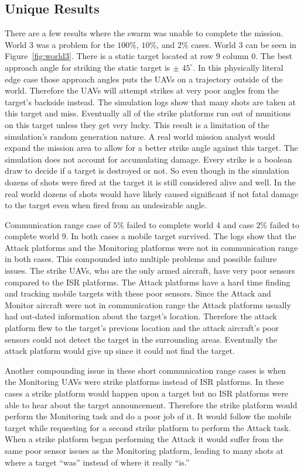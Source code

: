 \begin{multicols*}{2}
\section{Unique Results}
There are a few results where the swarm was unable to complete the mission.  World 3 was a problem for the $100\%$, $10\%$, and $2\%$ cases.  World 3 can be seen in Figure~\ref{fig:world3}.  There is a static target located at row 9 column 0.  The best approach angle for striking the static target is $\pm$ $45^{\circ}$.  In this physically literal edge case those approach angles puts the UAVs on a trajectory outside of the world.  Therefore the UAVs will attempt strikes at very poor angles from the target's backside instead.  The simulation logs show that many shots are taken at this target and miss.  Eventually all of the strike platforms run out of munitions on this target unless they get very lucky.  This result is a limitation of the simulation's random generation nature.  A real world mission analyst would expand the mission area to allow for a better strike angle against this target.  The simulation does not account for accumulating damage.  Every strike is a boolean draw to decide if a target is destroyed or not.  So even though in the simulation dozens of shots were fired at the target it is still considered alive and well.  In the real world dozens of shots would have likely caused significant if not fatal damage to the target even when fired from an undesirable angle.

Communication range case of $5\%$ failed to complete world 4 and case $2\%$ failed to complete world 9.  In both cases a mobile target survived.  The logs show that the Attack platforms and the Monitoring platforms were not in communication range in both cases.  This compounded into multiple problems and possible failure issues.  The strike UAVs, who are the only armed aircraft, have very poor sensors compared to the ISR platforms.  The Attack platforms have a hard time finding and tracking mobile targets with these poor sensors.  Since the Attack and Monitor aircraft were not in communication range the Attack platforms usually had out-dated information about the target's location.  Therefore the attack platform flew to the target's previous location and the attack aircraft's poor sensors could not detect the target in the surrounding areas.  Eventually the attack platform would give up since it could not find the target.

Another compounding issue in these short communication range cases is when the Monitoring UAVs were strike platforms instead of ISR platforms.  In these cases a strike platform would happen upon a target but no ISR platforms were able to hear about the target announcement.  Therefore the strike platform would perform the Monitoring task and do a poor job of it.  It would follow the mobile target while requesting for a second strike platform to perform the Attack task.  When a strike platform began performing the Attack it would suffer from the same poor sensor issues as the Monitoring platform, leading to many shots at where a target ``was'' instead of where it really ``is.''



\end{multicols*}
